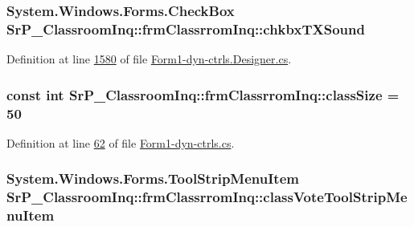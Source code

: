 \hypertarget{class_sr_p___classroom_inq_1_1frm_classrrom_inq_a63062a732e40b85f40aa3ba57d80223a}{
\subsubsection[{chkbx\-T\-X\-Sound}]{\setlength{\rightskip}{0pt plus 5cm}\-System.\-Windows.\-Forms.\-Check\-Box {\bf \-Sr\-P\-\_\-\-Classroom\-Inq\-::frm\-Classrrom\-Inq\-::chkbx\-T\-X\-Sound}}}
\label{class_sr_p___classroom_inq_1_1frm_classrrom_inq_a63062a732e40b85f40aa3ba57d80223a}


\-Definition at line \hyperlink{_form1-dyn-ctrls_8_designer_8cs_source_l01580}{1580} of file \hyperlink{_form1-dyn-ctrls_8_designer_8cs_source}{\-Form1-\/dyn-\/ctrls.\-Designer.\-cs}.

\hypertarget{class_sr_p___classroom_inq_1_1frm_classrrom_inq_a78d9aab335edfe53d39036b9d89928a8}{
\subsubsection[{class\-Size}]{\setlength{\rightskip}{0pt plus 5cm}const int {\bf \-Sr\-P\-\_\-\-Classroom\-Inq\-::frm\-Classrrom\-Inq\-::class\-Size} = 50}}
\label{class_sr_p___classroom_inq_1_1frm_classrrom_inq_a78d9aab335edfe53d39036b9d89928a8}


\-Definition at line \hyperlink{_form1-dyn-ctrls_8cs_source_l00062}{62} of file \hyperlink{_form1-dyn-ctrls_8cs_source}{\-Form1-\/dyn-\/ctrls.\-cs}.

\hypertarget{class_sr_p___classroom_inq_1_1frm_classrrom_inq_add88d2c77e31773b18b9a6b571f3207f}{
\subsubsection[{class\-Vote\-Tool\-Strip\-Menu\-Item}]{\setlength{\rightskip}{0pt plus 5cm}\-System.\-Windows.\-Forms.\-Tool\-Strip\-Menu\-Item {\bf \-Sr\-P\-\_\-\-Classroom\-Inq\-::frm\-Classrrom\-Inq\-::class\-Vote\-Tool\-Strip\-Menu\-Item}}}
\label{class_sr_p___classroom_inq_1_1frm_classrrom_inq_add88d2c77e31773b18b9a6b571f3207f}


